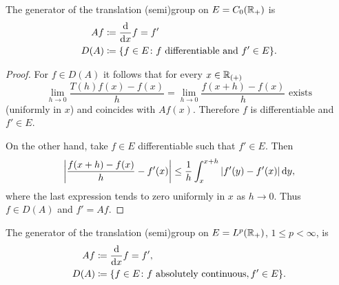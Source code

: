 The generator of the translation (semi)group on $E = C_{0}(\mathbb{R}_{+})$ is 
\begin{align*}
    Af & \coloneq \frac{\mathop{}\!\mathrm{d}{}}{\mathop{}\!\mathrm{d}{x}}f = f' \\
    D(A) &\coloneq \{f \in E \colon f \text{ differentiable and } f' \in E\}.
\end{align*}
\begin{proof}
For $f \in D(A)$ it follows that for every $x \in \mathbb{R}_{(+)}$
\[
    \lim_{h \to 0} \frac{T(h)f(x) - f(x)}{h} = \lim_{h \to 0} \frac{f(x+h) - f(x)}{h} \text{ exists}
\]
(uniformly in $x$) and coincides with $Af(x)$.
Therefore $f$ is differentiable and $f' \in E$.

On the other hand, take $f \in E$ differentiable such that $f' \in E$.
Then
\[
    \left|\frac{f(x+h) - f(x)}{h} - f'(x)\right| \leq \frac{1}{h}\int_{x}^{x+h}|f'(y) - f'(x)| \dy,
\]
where the last expression tends to zero uniformly in $x$ as $h \to 0$.
Thus $f \in D(A)$ and $f' = Af$.
\end{proof}
The generator of the translation (semi)group on $E = L^{p}(\mathbb{R}_{+})$, $1 \leq p < \infty$, is
\begin{align*}
    Af &\coloneq \frac{\mathop{}\!\mathrm{d}{}}{\mathop{}\!\mathrm{d}{x}}f = f', \\
    D(A) &\coloneq \{f \in E \colon f \text{ absolutely continuous}, f' \in E\}.
\end{align*}
